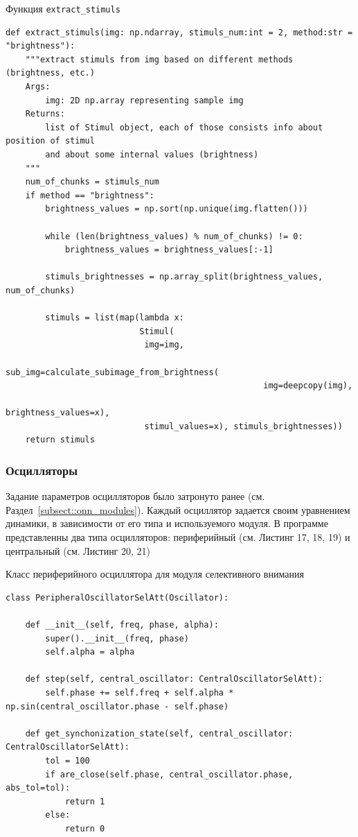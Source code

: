 \documentclass[14pt, russian]{scrartcl}
\begin{document}
\begin{listing}[H]
    \caption{Функция \texttt{extract\_stimuls}}
    \label{lst:contour_extr_sobel}
    \begin{verbatim}
def extract_stimuls(img: np.ndarray, stimuls_num:int = 2, method:str = "brightness"):
    """extract stimuls from img based on different methods (brightness, etc.)
    Args:
        img: 2D np.array representing sample img
    Returns:
        list of Stimul object, each of those consists info about position of stimul
        and about some internal values (brightness)
    """
    num_of_chunks = stimuls_num
    if method == "brightness":
        brightness_values = np.sort(np.unique(img.flatten()))

        while (len(brightness_values) % num_of_chunks) != 0:
            brightness_values = brightness_values[:-1]

        stimuls_brightnesses = np.array_split(brightness_values, num_of_chunks)
        
        stimuls = list(map(lambda x: 
                           Stimul(
                            img=img, 
                            sub_img=calculate_subimage_from_brightness(
                                                    img=deepcopy(img),
                                                    brightness_values=x),
                            stimul_values=x), stimuls_brightnesses))
    return stimuls
    \end{verbatim}
\end{listing}

\subsubsection{Осцилляторы}

Задание параметров осцилляторов было затронуто ранее (см. Раздел~\ref{subsect::onn_modules}). Каждый осциллятор задается своим уравнением динамики, в зависимости 
от его типа и используемого модуля. В программе представленны два типа осцилляторов: периферийный (см. Листинг 17, 18, 19) и центральный (см. Листинг 20, 21)

\begin{listing}[H]
    \caption{Класс периферийного осциллятора для модуля селективного внимания}
    \label{lst:contour_extr_sobel}
    \begin{verbatim}
class PeripheralOscillatorSelAtt(Oscillator):

    def __init__(self, freq, phase, alpha):
        super().__init__(freq, phase)
        self.alpha = alpha

    def step(self, central_oscillator: CentralOscillatorSelAtt):
        self.phase += self.freq + self.alpha * np.sin(central_oscillator.phase - self.phase)

    def get_synchonization_state(self, central_oscillator: CentralOscillatorSelAtt):
        tol = 100
        if are_close(self.phase, central_oscillator.phase, abs_tol=tol):
            return 1
        else:
            return 0
    \end{verbatim}
\end{listing}
\end{document}
